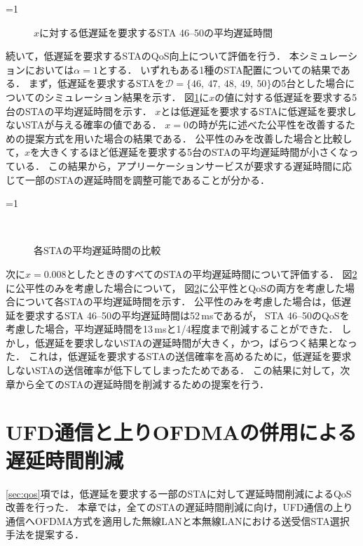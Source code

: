 \documentclass[technicalreport]{ieicej}
\newcounter{flagFig}
\begin{document}
			\par
			\ifnum\value{flagFig}=1 {\begin{figure}[t]
				\centering
					\caption{$x$に対する低遅延を要求するSTA 46--50の平均遅延時間}
					\label{fig:chnx}
			\end{figure}}\fi
			続いて，低遅延を要求するSTAのQoS向上について評価を行う．
			本シミュレーションにおいては$\alpha=1$とする．
			いずれもある1種のSTA配置についての結果である．
			まず，低遅延を要求するSTAを${\mathcal D}=\{46,\ 47,\ 48,\ 49,\ 50\}$の5台とした場合についてのシミュレーション結果を示す．
			図\ref{fig:chnx}に$x$の値に対する低遅延を要求する5台のSTAの平均遅延時間を示す．
			$x$とは低遅延を要求するSTAに低遅延を要求しないSTAが与える確率の値である．
			$x=0$の時が先に述べた公平性を改善するための提案方式を用いた場合の結果である．
			公平性のみを改善した場合と比較して，$x$を大きくするほど低遅延を要求する5台のSTAの平均遅延時間が小さくなっている．
			この結果から，アプリーケーションサービスが要求する遅延時間に応じて一部のSTAの遅延時間を調整可能であることが分かる．
			\par
			\ifnum\value{flagFig}=1 {\begin{figure}[t]
				\centering
					\\
					\caption{各STAの平均遅延時間の比較}
					\label{fig:inter}
			\end{figure}}\fi
			次に$x=0.008$としたときのすべてのSTAの平均遅延時間について評価する．
			図\ref{fig:inter}に公平性のみを考慮した場合について，
			図\ref{fig:inter}に公平性とQoSの両方を考慮した場合について各STAの平均遅延時間を示す．
			公平性のみを考慮した場合は，低遅延を要求するSTA 46--50の平均遅延時間は52\,msであるが，
			STA 46--50のQoSを考慮した場合，平均遅延時間を13\,msと1/4程度まで削減することができた．
			しかし，低遅延を要求しないSTAの遅延時間が大きく，かつ，ばらつく結果となった．
			これは，低遅延を要求するSTAの送信確率を高めるために，低遅延を要求しないSTAの送信確率が低下してしまったためである．
			この結果に対して，次章から全てのSTAの遅延時間を削減するための提案を行う．

\section{UFD通信と上りOFDMAの併用による遅延時間削減}
	\ref{sec:qos}項では，低遅延を要求する一部のSTAに対して遅延時間削減によるQoS改善を行った．
	本章では，全てのSTAの遅延時間削減に向け，UFD通信の上り通信へOFDMA方式を適用した無線LANと本無線LANにおける送受信STA選択手法を提案する．
\end{document}
